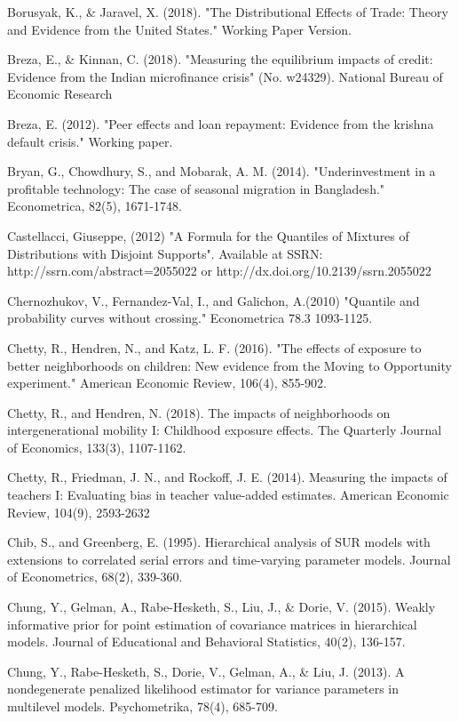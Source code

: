\documentclass[english,12pt]{article}\usepackage{lmodern}
\numberwithin{equation}{section}
\begin{document}
\begin{thebibliography}{99}
 Borusyak, K., \& Jaravel, X. (2018). "The Distributional Effects of Trade: Theory and Evidence from the United States." Working Paper Version.

 Breza, E., \& Kinnan, C. (2018). "Measuring the equilibrium impacts of credit: Evidence from the Indian microfinance crisis" (No. w24329). National Bureau of Economic Research

 Breza, E. (2012). "Peer effects and loan repayment: Evidence from the krishna default crisis." Working paper.

 Bryan, G., Chowdhury, S., and Mobarak, A. M. (2014). "Underinvestment in a profitable technology: The case of seasonal migration in Bangladesh." Econometrica, 82(5), 1671-1748.

 Castellacci, Giuseppe, (2012) "A Formula for the Quantiles of Mixtures of Distributions with Disjoint Supports". Available at SSRN: http://ssrn.com/abstract=2055022 or http://dx.doi.org/10.2139/ssrn.2055022

 Chernozhukov, V., Fernandez-Val, I., and Galichon, A.(2010) "Quantile and probability curves without crossing." Econometrica 78.3  1093-1125.

 Chetty, R., Hendren, N., and Katz, L. F. (2016). "The effects of exposure to better neighborhoods on children: New evidence from the Moving to Opportunity experiment." American Economic Review, 106(4), 855-902.

 Chetty, R., and Hendren, N. (2018). The impacts of neighborhoods on intergenerational mobility I: Childhood exposure effects. The Quarterly Journal of Economics, 133(3), 1107-1162.

 Chetty, R., Friedman, J. N., and Rockoff, J. E. (2014). Measuring the impacts of teachers I: Evaluating bias in teacher value-added estimates. American Economic Review, 104(9), 2593-2632

 Chib, S., and Greenberg, E. (1995). Hierarchical analysis of SUR models with extensions to correlated serial errors and time-varying parameter models. Journal of Econometrics, 68(2), 339-360.

 Chung, Y., Gelman, A., Rabe-Hesketh, S., Liu, J., \& Dorie, V. (2015). Weakly informative prior for point estimation of covariance matrices in hierarchical models. Journal of Educational and Behavioral Statistics, 40(2), 136-157.

 Chung, Y., Rabe-Hesketh, S., Dorie, V., Gelman, A., \& Liu, J. (2013). A nondegenerate penalized likelihood estimator for variance parameters in multilevel models. Psychometrika, 78(4), 685-709.


\end{thebibliography}
\end{document}
